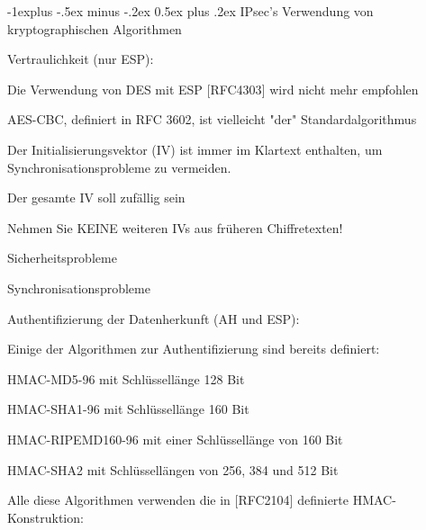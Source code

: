 \documentclass[a4paper]{article}
\makeatletter
\renewcommand{\subsection}{\@startsection{subsection}{2}{0mm}%
 {-1explus -.5ex minus -.2ex}%
 {0.5ex plus .2ex}%
 {\normalfont\normalsize\bfseries}}
\makeatother
\begin{document}
\begin{multicols}{3}
      \subsection{IPsec's Verwendung von kryptographischen Algorithmen}
      \begin{itemize*}
            \item Vertraulichkeit (nur ESP):
            \begin{itemize*}
                  \item Die Verwendung von DES mit ESP {[}RFC4303{]} wird nicht mehr empfohlen
                  \item AES-CBC, definiert in RFC 3602, ist vielleicht "der" Standardalgorithmus
                  \item Der Initialisierungsvektor (IV) ist immer im Klartext enthalten, um Synchronisationsprobleme zu vermeiden.
                  \item Der gesamte IV soll zufällig sein
                  \item Nehmen Sie KEINE weiteren IVs aus früheren Chiffretexten!
                  \begin{itemize*}
                        \item Sicherheitsprobleme
                        \item Synchronisationsprobleme
                  \end{itemize*}
            \end{itemize*}
            \item Authentifizierung der Datenherkunft (AH und ESP):
            \begin{itemize*}
                  \item Einige der Algorithmen zur Authentifizierung sind bereits definiert:
                  \begin{itemize*} \item HMAC-MD5-96 mit Schlüssellänge 128 Bit \item HMAC-SHA1-96 mit Schlüssellänge 160 Bit \item HMAC-RIPEMD160-96 mit einer Schlüssellänge von 160 Bit \item HMAC-SHA2 mit Schlüssellängen von 256, 384 und 512 Bit \end{itemize*}
                  \item Alle diese Algorithmen verwenden die in {[}RFC2104{]} definierte HMAC-Konstruktion:

\end{itemize*}
\end{itemize*}
\end{multicols}
\end{document}
